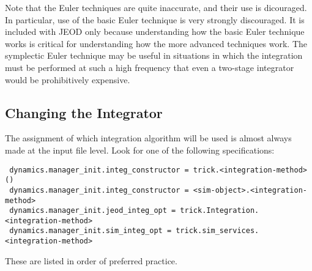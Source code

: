 Note that the Euler techniques are quite inaccurate, and their use is
dicouraged.  In particular, use of the basic Euler technique is very strongly
discouraged. It is included with JEOD only because understanding how the basic
Euler technique works is critical for understanding how the more advanced
techniques work.  The symplectic Euler technique may be useful in situations
in which the integration must be
performed at such a high frequency that even a two-stage integrator would be
prohibitively expensive.


\subsection{Changing the Integrator}
The assignment of which integration algorithm will be used is almost always
made at the input file level.  Look for one of the following
specifications:
\begin{verbatim}
 dynamics.manager_init.integ_constructor = trick.<integration-method>()
 dynamics.manager_init.integ_constructor = <sim-object>.<integration-method>
 dynamics.manager_init.jeod_integ_opt = trick.Integration.<integration-method>
 dynamics.manager_init.sim_integ_opt = trick.sim_services.<integration-method>
\end{verbatim}

These are listed in order of preferred practice.

